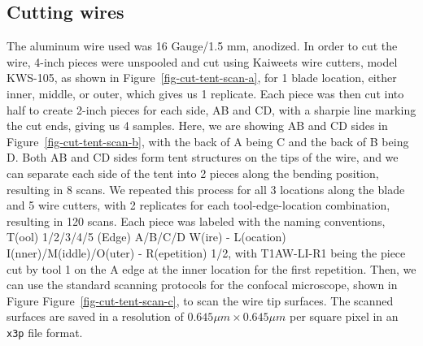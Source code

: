 \documentclass[fleqn,10pt]{wlscirep}
\begin{document}
\subsection*{Cutting wires}\label{sec-cutting-wires}

The aluminum wire used was 16 Gauge/1.5 mm, anodized. In order to cut
the wire, 4-inch pieces were unspooled and cut using Kaiweets wire
cutters, model KWS-105, as shown in Figure~\ref{fig-cut-tent-scan-a},
for 1 blade location, either inner, middle, or outer, which gives us 1
replicate. Each piece was then cut into half to create 2-inch pieces for
each side, AB and CD, with a sharpie line marking the cut ends, giving
us 4 samples. Here, we are showing AB and CD sides in
Figure~\ref{fig-cut-tent-scan-b}, with the back of A being C and the
back of B being D. Both AB and CD sides form tent structures on the tips
of the wire, and we can separate each side of the tent into 2 pieces
along the bending position, resulting in 8 scans. We repeated this
process for all 3 locations along the blade and 5 wire cutters, with 2
replicates for each tool-edge-location combination, resulting in 120
scans. Each piece was labeled with the naming conventions, T(ool)
1/2/3/4/5 (Edge) A/B/C/D W(ire) - L(ocation) I(nner)/M(iddle)/O(uter) -
R(epetition) 1/2, with T1AW-LI-R1 being the piece cut by tool 1 on the A
edge at the inner location for the first repetition. Then, we can use
the standard scanning protocols for the confocal microscope, shown in
Figure Figure~\ref{fig-cut-tent-scan-c}, to scan the wire tip surfaces.
The scanned surfaces are saved in a resolution of
\(0.645 \mu m \times 0.645 \mu m\) per square pixel in an \texttt{x3p}
file format.
\end{document}
